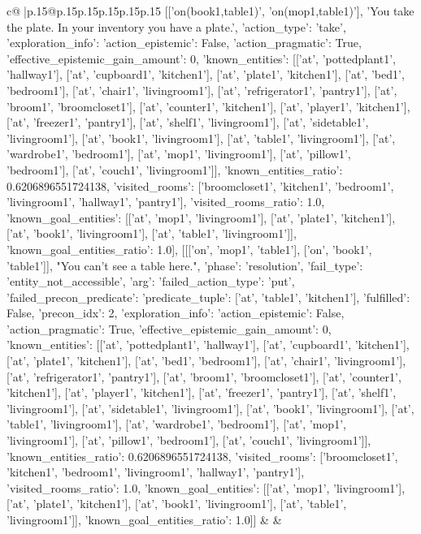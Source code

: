 \documentclass{article}
\begin{document}
{\begin{supertabular}{c@{$\;$}|p{.15\linewidth}@{}p{.15\linewidth}p{.15\linewidth}p{.15\linewidth}p{.15\linewidth}p{.15\linewidth}}
{{{[['on(book1,table1)', 'on(mop1,table1)'], 'You take the plate. In your inventory you have a plate.', {'action_type': 'take', 'exploration_info': {'action_epistemic': False, 'action_pragmatic': True, 'effective_epistemic_gain_amount': 0, 'known_entities': [['at', 'pottedplant1', 'hallway1'], ['at', 'cupboard1', 'kitchen1'], ['at', 'plate1', 'kitchen1'], ['at', 'bed1', 'bedroom1'], ['at', 'chair1', 'livingroom1'], ['at', 'refrigerator1', 'pantry1'], ['at', 'broom1', 'broomcloset1'], ['at', 'counter1', 'kitchen1'], ['at', 'player1', 'kitchen1'], ['at', 'freezer1', 'pantry1'], ['at', 'shelf1', 'livingroom1'], ['at', 'sidetable1', 'livingroom1'], ['at', 'book1', 'livingroom1'], ['at', 'table1', 'livingroom1'], ['at', 'wardrobe1', 'bedroom1'], ['at', 'mop1', 'livingroom1'], ['at', 'pillow1', 'bedroom1'], ['at', 'couch1', 'livingroom1']], 'known_entities_ratio': 0.6206896551724138, 'visited_rooms': ['broomcloset1', 'kitchen1', 'bedroom1', 'livingroom1', 'hallway1', 'pantry1'], 'visited_rooms_ratio': 1.0, 'known_goal_entities': [['at', 'mop1', 'livingroom1'], ['at', 'plate1', 'kitchen1'], ['at', 'book1', 'livingroom1'], ['at', 'table1', 'livingroom1']], 'known_goal_entities_ratio': 1.0}}], [[['on', 'mop1', 'table1'], ['on', 'book1', 'table1']], "You can't see a table here.", {'phase': 'resolution', 'fail_type': 'entity_not_accessible', 'arg': {'failed_action_type': 'put', 'failed_precon_predicate': {'predicate_tuple': ['at', 'table1', 'kitchen1'], 'fulfilled': False, 'precon_idx': 2}}, 'exploration_info': {'action_epistemic': False, 'action_pragmatic': True, 'effective_epistemic_gain_amount': 0, 'known_entities': [['at', 'pottedplant1', 'hallway1'], ['at', 'cupboard1', 'kitchen1'], ['at', 'plate1', 'kitchen1'], ['at', 'bed1', 'bedroom1'], ['at', 'chair1', 'livingroom1'], ['at', 'refrigerator1', 'pantry1'], ['at', 'broom1', 'broomcloset1'], ['at', 'counter1', 'kitchen1'], ['at', 'player1', 'kitchen1'], ['at', 'freezer1', 'pantry1'], ['at', 'shelf1', 'livingroom1'], ['at', 'sidetable1', 'livingroom1'], ['at', 'book1', 'livingroom1'], ['at', 'table1', 'livingroom1'], ['at', 'wardrobe1', 'bedroom1'], ['at', 'mop1', 'livingroom1'], ['at', 'pillow1', 'bedroom1'], ['at', 'couch1', 'livingroom1']], 'known_entities_ratio': 0.6206896551724138, 'visited_rooms': ['broomcloset1', 'kitchen1', 'bedroom1', 'livingroom1', 'hallway1', 'pantry1'], 'visited_rooms_ratio': 1.0, 'known_goal_entities': [['at', 'mop1', 'livingroom1'], ['at', 'plate1', 'kitchen1'], ['at', 'book1', 'livingroom1'], ['at', 'table1', 'livingroom1']], 'known_goal_entities_ratio': 1.0}}]] 
	  } 
	   } 
	   } 
	 & & \\ 
 


\end{supertabular}}
\end{document}
